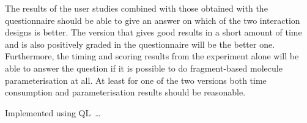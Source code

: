 The results of the user studies combined with those obtained with the questionnaire should be able to give an answer on which of the two interaction designs is better. The version that gives good results in a short amount of time and is also positively graded in the questionnaire will be the better one. Furthermore, the timing and scoring results from the experiment alone will be able to answer the question if it is possible to do fragment-based molecule parameterisation at all. At least for one of the two versions both time consumption and parameterisation results should be reasonable.


Implemented using QL~\cite{erdweg2013state}\ldots
